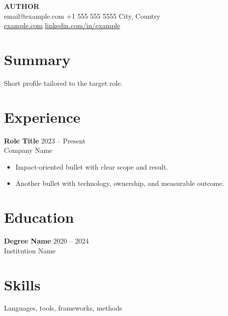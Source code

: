 \documentclass[11pt]{article}
\begin{document}
\begin{center}
  {\LARGE \textbf{{{AUTHOR}}}}\\
  email@example.com \textbar{} +1 555 555 5555 \textbar{} City, Country \\
  \href{https://example.com}{example.com} \textbar{} \href{https://linkedin.com/in/example}{linkedin.com/in/example}
\end{center}

\section*{Summary}
Short profile tailored to the target role.

\section*{Experience}
\textbf{Role Title} \hfill 2023 -- Present \\
Company Name
\begin{itemize}
  \item Impact-oriented bullet with clear scope and result.
  \item Another bullet with technology, ownership, and measurable outcome.
\end{itemize}

\section*{Education}
\textbf{Degree Name} \hfill 2020 -- 2024 \\
Institution Name

\section*{Skills}
Languages, tools, frameworks, methods
\end{document}
